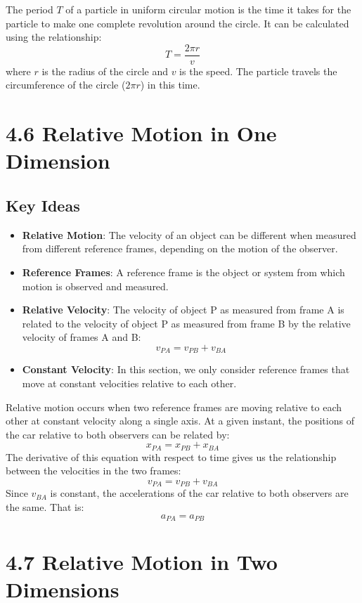 \documentclass{article}
\begin{document}
The period $T$ of a particle in uniform circular motion is the time it takes for the particle to make one complete revolution around the circle. It can be calculated using the relationship:
\[
T = \frac{2\pi r}{v}
\]
where $r$ is the radius of the circle and $v$ is the speed. The particle travels the circumference of the circle ($2\pi r$) in this time.

\section*{4.6 Relative Motion in One Dimension}
\subsection*{Key Ideas}
\begin{itemize}
    \item \textbf{Relative Motion}: The velocity of an object can be different when measured from different reference frames, depending on the motion of the observer.
    \item \textbf{Reference Frames}: A reference frame is the object or system from which motion is observed and measured.
    \item \textbf{Relative Velocity}: The velocity of object P as measured from frame A is related to the velocity of object P as measured from frame B by the relative velocity of frames A and B:
    \[
    v_{PA} = v_{PB} + v_{BA}
    \]
    \item \textbf{Constant Velocity}: In this section, we only consider reference frames that move at constant velocities relative to each other.
\end{itemize}
Relative motion occurs when two reference frames are moving relative to each other at constant velocity along a single axis. At a given instant, the positions of the car relative to both observers can be related by:
\[
x_{PA} = x_{PB} + x_{BA}
\]
The derivative of this equation with respect to time gives us the relationship between the velocities in the two frames:
\[
v_{PA} = v_{PB} + v_{BA}
\]
Since $v_{BA}$ is constant, the accelerations of the car relative to both observers are the same. That is:
\[
a_{PA} = a_{PB}
\]

\section*{4.7 Relative Motion in Two Dimensions}
\end{document}
